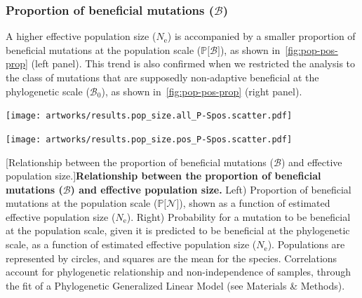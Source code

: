 \documentclass{article}
\newcommand{\Ne}{N_{\text{e}}}
\newcommand{\proba}{\mathbb{P}}
\newcommand{\SphyBen}{\mathcal{B}_0}
\newcommand{\SpopNeu}{\mathcal{N}}
\newcommand{\SpopBen}{\mathcal{B}}
\begin{document}
    \subsubsection{Proportion of beneficial mutations (\texorpdfstring{$\SpopBen$}{B})}\label{subsec:proportion-beneficial-mutations}
    A higher effective population size ($\Ne$) is accompanied by a smaller proportion of beneficial mutations at the population scale ($\proba{[} \SpopBen {]}$), as shown in~\ref{fig:pop-pos-prop} (left panel).
    This trend is also confirmed when we restricted the analysis to the class of mutations that are supposedly non-adaptive beneficial at the phylogenetic scale ($\SphyBen$), as shown in~\ref{fig:pop-pos-prop} (right panel).

    \begin{center}
        \begin{minipage}{0.45\linewidth}
            \texttt{[image: artworks/results.pop\_size.all\_P-Spos.scatter.pdf]}
        \end{minipage}
        \begin{minipage}{0.45\linewidth}
            \texttt{[image: artworks/results.pop\_size.pos\_P-Spos.scatter.pdf]}
        \end{minipage}
        [Relationship between the proportion of beneficial mutations ($\SpopBen$) and effective population size.]{\textbf{Relationship between the proportion of beneficial mutations ($\bm{\SpopBen}$) and effective population size.}
        Left) Proportion of beneficial mutations at the population scale ($\proba{[} \SpopNeu{]}$), shown as a function of estimated effective population size ($\Ne$). Right) Probability for a mutation to be beneficial at the population scale, given it is predicted to be beneficial at the phylogenetic scale, as a function of estimated effective population size ($\Ne$). Populations are represented by circles, and squares are the mean for the species. Correlations account for phylogenetic relationship and non-independence of samples, through the fit of a Phylogenetic Generalized Linear Model (see Materials \& Methods).\label{fig:pop-pos-prop}}
    \end{center}


    \printbibliography
\end{document}
